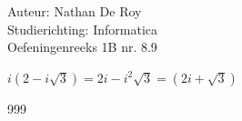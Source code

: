 \documentclass[a4paper]{article}
\begin{document}
  
\noindent \large Auteur: Nathan De Roy \\
\noindent \large Studierichting: Informatica\\
\noindent \large Oefeningenreeks 1B nr. 8.9\\

\medskip

\normalsize

$i(2-i\sqrt{3}) = 2i - i^2\sqrt{3} = (2i + \sqrt{3})$\\

\begin{thebibliography}{999}
\end{thebibliography}
\end{document}
